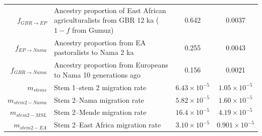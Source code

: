 \documentclass[]{article}
\begin{document}
\begin{table}[ht]
\begin{tabular}[t]{rP{8cm}cc}
    $f_{GBR \rightarrow EP}$ & Ancestry proportion of East African agriculturalists from GBR 12 ka ($1-f$ from Gumuz) & 0.642 & 0.0037 \\
    $f_{EP \rightarrow Nama}$ & Ancestry proportion from EA pastoralists to Nama 2 ka & 0.255 & 0.0043 \\
    $f_{GBR \rightarrow Nama}$ & Ancestry proportion from Europeans to Nama 10 generations ago & 0.156 & 0.0021 \\
    $m_{stems}$ & Stem 1--stem 2 migration rate & $6.43\times10^{-5}$ & $1.05\times10^{-5}$ \\
    $m_{stem2-Nama}$ & Stem 2--Nama migration rate & $5.82\times10^{-5}$ & $1.60\times10^{-5}$ \\
    $m_{stem2-MSL}$ & Stem 2--Mende migration rate & $16.4\times10^{-5}$ & $4.19\times10^{-5}$ \\
    $m_{stem2-EA}$ & Stem 2--East Africa migration rate & $3.10\times10^{-5}$ & $0.901\times10^{-5}$ \\
    \bottomrule
\end{tabular}
\end{table}
\end{document}
